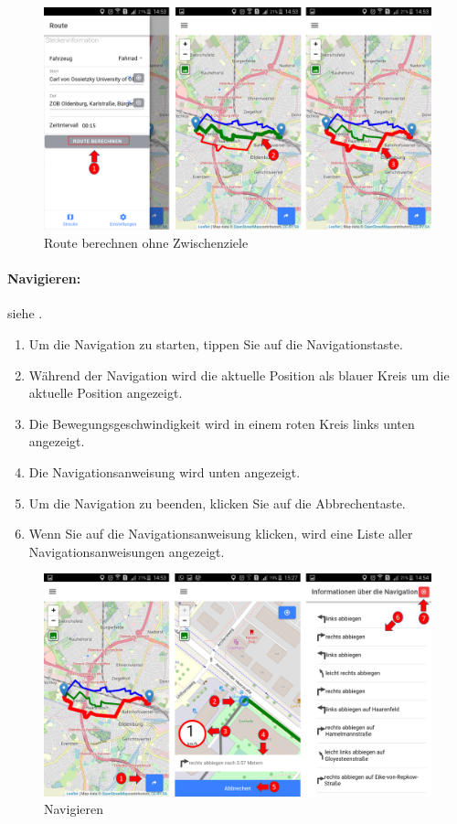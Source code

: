 \begin{itemize}
\begin{figure}[h!]
\centerline{\includegraphics[height=8 cm]{./ressourcen/nutzerhandbuch/route_berechnen.png}}
\caption{Route berechnen ohne Zwischenziele}
\label{fig:app:route_berechnen}
\end{figure} 

\end{itemize}


\newpage
\paragraph{Navigieren:}
siehe .
\begin{enumerate}
  \item Um die Navigation zu starten, tippen Sie auf die Navigationstaste. 
  \item Während der Navigation wird die aktuelle Position als blauer Kreis um die aktuelle Position angezeigt.
  \item Die Bewegungsgeschwindigkeit wird in einem roten Kreis links unten angezeigt.
  \item Die Navigationsanweisung wird unten angezeigt.
  \item Um die Navigation zu beenden, klicken Sie auf die Abbrechentaste.
  \item Wenn Sie auf die Navigationsanweisung klicken, wird eine Liste aller Navigationsanweisungen angezeigt.
\end{enumerate}

\begin{figure}[h!]
\centerline{\includegraphics[height=8 cm]{./ressourcen/nutzerhandbuch/navigate.png}}
\caption{Navigieren}
\label{fig:app:Navigieren}
\end{figure}

